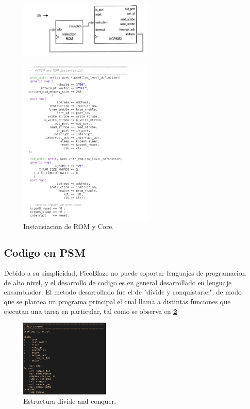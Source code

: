 \documentclass[11pt, a4paper]{article}
\begin{document}
		\begin{figure}[H]
			\centering
			\includegraphics[width=0.6\textwidth]{Imagenes/top-level.png}
		\end{figure} 
		
		\begin{figure}[H]
			\centering
			\includegraphics[width=0.6\textwidth]{Imagenes/kcpsm6_inst.png}
			\caption{Instansiacion de ROM y Core.}
			\label{fig:kcpsm6_inst}
		\end{figure} 

	\subsection{Codigo en PSM}
	Debido a su simplicidad, PicoBlaze no puede soportar lenguajes de programacion de alto nivel, y el desarrollo de codigo es en general desarrollado en lenguaje ensamblador. El metodo desarrollado fue el de "divide y conquistaras", de modo que se plantea un programa principal el cual llama a distintas funciones que ejecutan una tarea en particular, tal como se observa en \textcolor{blue}{\textbf{\ref{fig:asm_top}}}
		
		\begin{figure}[H]
			\centering
			\includegraphics[width=0.4\textwidth]{Imagenes/asm-top.png}
			\caption{Estructura divide and conquer.}
			\label{fig:asm_top}
		\end{figure} 
	
\end{document}
